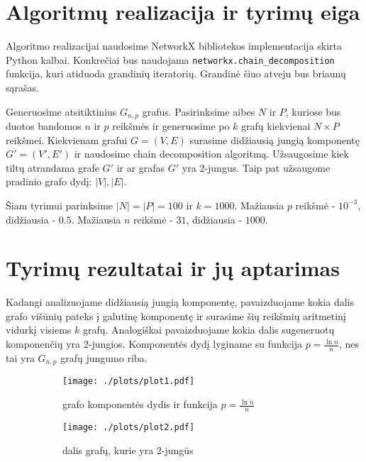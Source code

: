 \documentclass[bibliography=totoc]{article}
\begin{document}
\clearpage
\newpage
\section{Algoritmų realizacija ir tyrimų eiga}
Algoritmo realizacijai naudosime NetworkX bibliotekos implementacija skirta Python kalbai. Konkrečiai bus naudojama \texttt{networkx.chain\_decomposition} funkcija, kuri atiduoda grandinių iteratorių. Grandinė šiuo atveju bus briaunų sąrašas.

Generuosime atsitiktinius $G_{n,p}$ grafus. Pasirinksime aibes $N$ ir $P$, kuriose bus duotos bandomos $n$ ir $p$ reikšmės ir generuosime po $k$ grafų kiekvienai $N \times P$ reikšmei. Kiekvienam grafui $G = (V, E)$ surasime didžiausią jungią komponentę $G' = (V', E')$ ir naudosime chain decomposition algoritmą. Užsaugosime kiek tiltų atrandama grafe $G'$ ir ar grafas $G'$ yra 2-jungus. Taip pat užsaugome pradinio grafo dydį: $|V|, |E|$.

Šiam tyrimui parinksime $|N| = |P| = 100$ ir $k = 1000$. Mažiausia $p$ reikšmė - $10^{-3}$, didžiausia - $0.5$. Mažiausia $n$ reikšmė - $31$, didžiausia - $1000$.

\newpage
\section{Tyrimų rezultatai ir jų aptarimas}
Kadangi analizuojame didžiausią jungią komponentę, pavaizduojame kokia dalis grafo višūnių pateks į galutinę komponentę ir surasime šių reikšmių aritmetinį vidurkį visiems $k$ grafų. Analogiškai pavaizduojame kokia dalis sugeneruotų komponenčių yra 2-jungios. Komponentės dydį lyginame su funkcija $p = \frac{\ln n}{n}$, nes tai yra $G_{n,p}$ grafų jungumo riba. \citep{erd6s1960evolution}

\begin{figure}[H]
    \begin{subfigure}{.5\textwidth}
        \begin{center}
            \texttt{[image: ./plots/plot1.pdf]}
        \end{center}
        \caption{grafo komponentės dydis ir funkcija $p = \frac{\ln n}{n}$}
    \end{subfigure}
    \begin{subfigure}{.5\textwidth}
        \begin{center}
            \texttt{[image: ./plots/plot2.pdf]}
        \end{center}
        \caption{dalis grafų, kurie yra 2-jungūs}
    \end{subfigure}
    \caption{}
\end{figure}
\end{document}
